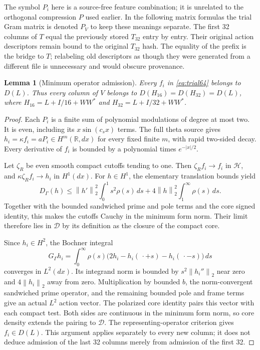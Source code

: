 \documentclass[11pt,a4paper]{article}
\numberwithin{equation}{section}
\newtheorem{lemma}[theorem]{Lemma}
\theoremstyle{definition}\newtheorem{definition}[theorem]{Definition}
\theoremstyle{remark}\newtheorem{remark}[theorem]{Remark}
\newcommand{\HH}{\mathcal H}
\newcommand{\DD}{\mathcal D}
\newcommand{\R}{\mathbb R}
\newcommand{\norm}[1]{\left\|#1\right\|}
\begin{document}
The symbol $P_i$ here is a source-free feature combination; it is unrelated to the orthogonal compression $P$ used earlier. In the following matrix formulas the trial Gram matrix is denoted $P_V$ to keep these meanings separate. The first 32 columns of $T$ equal the previously stored $T_{32}$ entry by entry. Their original action descriptors remain bound to the original $T_{32}$ hash. The equality of the prefix is the bridge to $T$; relabeling old descriptors as though they were generated from a different file is unnecessary and would obscure provenance.

\begin{lemma}[Minimum operator admission]\label{lem:admit64}
Every $f_i$ in \eqref{eq:trial64} belongs to $D(L)$. Thus every column of $V$ belongs to $D(H_{16})=D(H_{32})=D(L)$, where
$H_{16}=L+I/16+WW^*$ and $H_{32}=L+I/32+WW^*$.
\end{lemma}
\begin{proof}
Each $P_i$ is a finite sum of polynomial modulations of degree at most two. It is even, including its $x\sin(c_sx)$ terms. The full theta source gives $h_i=\kappa f_i=aP_i\in H^m(\R,dx)$ for every fixed finite $m$, with rapid two-sided decay. Every derivative of $f_i$ is bounded by a polynomial times $e^{-|x|/2}$.

Let $\zeta_R$ be even smooth compact cutoffs tending to one. Then $\zeta_R f_i\to f_i$ in $\HH$, and $\kappa\zeta_R f_i\to h_i$ in $H^1(dx)$. For $h\in H^1$, the elementary translation bounds yield
\begin{equation}\label{eq:cutoff64}
 D_\Gamma(h)\le\norm{h'}_2^2\int_0^1s^2\rho(s)\,ds
 +4\norm h_2^2\int_1^\infty\rho(s)\,ds.
\end{equation}
Together with the bounded sandwiched prime and pole terms and the core signed identity, this makes the cutoffs Cauchy in the minimum form norm. Their limit therefore lies in $\DD$ by its definition as the closure of the compact core.

Since $h_i\in H^2$, the Bochner integral
\[
 G_\Gamma h_i=\int_0^\infty\rho(s)
 \bigl(2h_i-h_i(\,\cdot+s)-h_i(\,\cdot-s)\bigr)\,ds
\]
converges in $L^2(dx)$. Its integrand norm is bounded by $s^2\norm{h_i''}_2$ near zero and $4\norm{h_i}_2$ away from zero. Multiplication by bounded $b$, the norm-convergent sandwiched prime operator, and the remaining bounded pole and frame terms give an actual $L^2$ action vector. The polarized core identity pairs this vector with each compact test. Both sides are continuous in the minimum form norm, so core density extends the pairing to $\DD$. The representing-operator criterion gives $f_i\in D(L)$. This argument applies separately to every new column; it does not deduce admission of the last 32 columns merely from admission of the first 32.
\end{proof}
\end{document}
